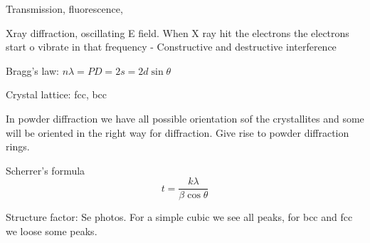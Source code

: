 Transmission, fluorescence, 

Xray diffraction, oscillating E field. When X ray hit the electrons the electrons start o vibrate in that frequency
- Constructive and destructive interference 

Bragg's law: $n\lambda=PD=2s=2d\sin\theta$

Crystal lattice: fcc, bcc


In powder diffraction we have all possible orientation sof the crystallites and some will be oriented in the right way for diffraction. Give rise to powder diffraction rings. 

Scherrer's formula
\begin{equation}
    t=\frac{k\lambda}{\beta\cos\theta}
\end{equation}

Structure factor: Se photos. For a simple cubic we see all peaks, for bcc and fcc we loose some peaks. 

